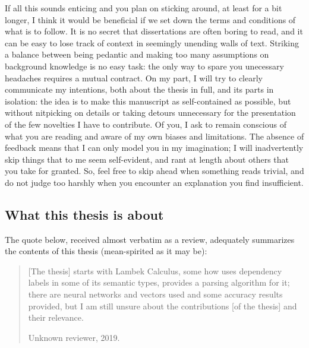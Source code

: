 If all this sounds enticing and you plan on sticking around, at least for a bit longer, I think it would be beneficial if we set down the terms and conditions of what is to follow. 
It is no secret that dissertations are often boring to read, and it can be easy to lose track of context in seemingly unending walls of text. 
Striking a balance between being pedantic and making too many assumptions on background knowledge is no easy task: the only way to spare you unecessary headaches requires a mutual contract. 
On my part, I will try to clearly communicate my intentions, both about the thesis in full, and its parts in isolation: the idea is to make this manuscript as self-contained as possible, but without nitpicking on details or taking detours unnecessary for the presentation of the few novelties I have to contribute.
Of you, I ask to remain conscious of what you are reading and aware of my own biases and limitations. 
The absence of feedback means that I can only model you in my imagination; 
I will inadvertently skip things that to me seem self-evident, and rant at length about others that you take for granted.
So, feel free to skip ahead when something reads trivial, and do not judge too harshly when you encounter an explanation you find insufficient.

\subsection*{What this thesis is about}
The quote below, received almost verbatim as a review, adequately summarizes the contents of this thesis (mean-spirited as it may be):
\begin{quote}
[The thesis] starts with Lambek Calculus, some how uses dependency labels in some of its semantic types, provides a parsing algorithm for it; there are neural networks and vectors used and some accuracy results provided, but I am still unsure about the contributions [of the thesis] and their relevance.
\begin{flushright} Unknown reviewer, 2019.\end{flushright}
\end{quote}




